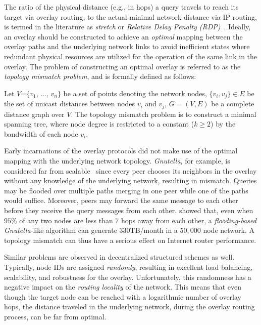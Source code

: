 The ratio of the physical distance (e.g., in hops) a query travels to
reach its target via overlay routing, to the actual minimal network distance via
IP routing, is termed in the literature as \emph{stretch} or \emph{Relative
Delay Penalty (RDP)}~\cite{CRZ2000}.
Ideally, an overlay should be constructed to achieve an \emph{optimal} 
mapping between the overlay paths and the underlying network links to avoid
inefficient states where redundant physical resources are utilized for the
operation of the same link in the overlay.
The problem of constructing an optimal
overlay is referred to as the \emph{topology mismatch problem}, and is formally
defined as follows:
\begin{definition}
Let $V$=$\{v_1$, $\dots$, $v_n\}$ be a set of points denoting the network nodes,
$\{v_i, v_j\} \in E$ be the set of unicast distances between nodes $v_i$ and
$v_j$, $G=(V,E)$ be a complete distance graph over $V$. The topology mismatch
problem is to construct a minimal spanning tree, where node degree is
restricted to a constant ($k\geq 2$) by the bandwidth of each node $v_i$.
\end{definition}

Early incarnations of the overlay protocols did not make use of the optimal
mapping with the underlying network topology. {\sl Gnutella}, for example, is
considered far from scalable~\cite{ritter_gnucantscale_2001} since every peer
chooses its neighbors in the overlay without any knowledge of the underlying
network, resulting in mismatch. 
Queries may be flooded over multiple paths merging in one peer 
while one of the paths would suffice.  
Moreover, peers may forward the same message to each other
before they receive the query messages from each other.
\cite{matei_mapgnutella_2002} showed that, even when $95$\% of any two nodes 
are less than $7$ hops away from each other, 
a \emph{flooding-based} {\sl Gnutella}-like algorithm 
can generate $330$TB/month in a $50,000$ node network. 
A topology mismatch can thus have a serious effect 
on Internet router performance.

Similar problems are observed in decentralized structured schemes as well.
Typically, node IDs are assigned \emph{randomly}, resulting in excellent load
balancing, scalability, and robustness for the overlay. Unfortunately, this
randomness has a negative impact on the \emph{routing locality} of the network.
This means that even though the target node can be reached with a logarithmic
number of overlay hops, the distance traveled in the underlying network, 
during the overlay routing process, can be far from optimal.

